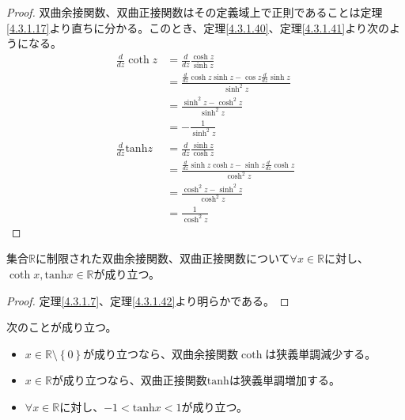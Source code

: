 \documentclass[dvipdfmx]{jsarticle}
\begin{document}
\begin{proof}
双曲余接関数、双曲正接関数はその定義域上で正則であることは定理\ref{4.3.1.17}より直ちに分かる。このとき、定理\ref{4.3.1.40}、定理\ref{4.3.1.41}より次のようになる。
\begin{align*}
\frac{d}{dz}\coth z &= \frac{d}{dz}\frac{\cosh z}{\sinh z}\\
&= \frac{\frac{d}{dz}\cosh z\sinh z - \cos z\frac{d}{dz}\sinh z}{\sinh^{2}z}\\
&= \frac{\sinh^{2}z - \cosh^{2}z}{\sinh^{2}z}\\
&= - \frac{1}{\sinh^{2}z}\\
\frac{d}{dz}\mathrm{tanh} z &= \frac{d}{dz}\frac{\sinh z}{\cosh z}\\
&= \frac{\frac{d}{dz}\sinh z\cosh z - \sinh z\frac{d}{dz}\cosh z}{\cosh^{2}z}\\
&= \frac{\cosh^{2}z - \sinh^{2}z}{\cosh^{2}z}\\
&= \frac{1}{\cosh^{2}z}
\end{align*}
\end{proof}
\begin{thm}\label{4.3.1.45}
集合$\mathbb{R}$に制限された双曲余接関数、双曲正接関数について$\forall x \in \mathbb{R}$に対し、$\coth x,\mathrm{tanh} x \in \mathbb{R}$が成り立つ。
\end{thm}
\begin{proof} 定理\ref{4.3.1.7}、定理\ref{4.3.1.42}より明らかである。
\end{proof}
\begin{thm}\label{4.3.1.46} 次のことが成り立つ。
\begin{itemize}
\item
  $x \in \mathbb{R} \setminus \left\{ 0 \right\}$が成り立つなら、双曲余接関数$\coth$は狭義単調減少する。
\item
  $x \in \mathbb{R}$が成り立つなら、双曲正接関数$\mathrm{tanh}$は狭義単調増加する。
\item
  $\forall x \in \mathbb{R}$に対し、$- 1 < \mathrm{tanh} x < 1$が成り立つ。
\end{itemize}
\end{thm}
\end{document}
